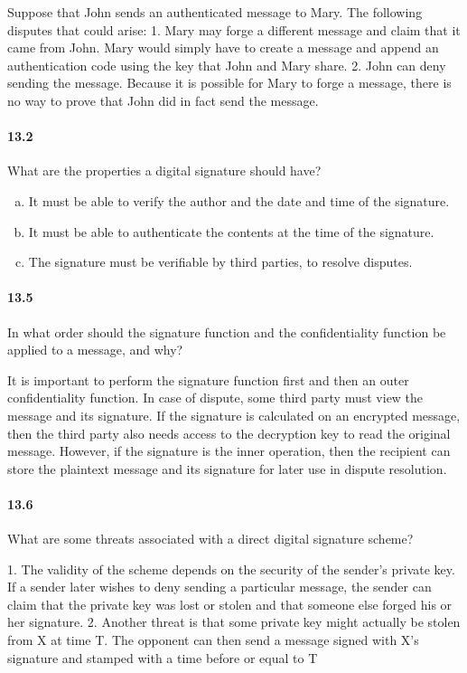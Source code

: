 \documentclass[UTF8]{article}
\begin{document}
Suppose that John sends an authenticated message to Mary. The following disputes that could arise: 1. Mary may forge a different message and claim that it came from John. Mary would simply have to create a message and append an authentication code using the key that John and Mary share. 2. John can deny sending the message. Because it is possible for Mary to forge a message, there is no way to prove that John did in fact send the message.
\paragraph{13.2}
What are the properties a digital signature should have?

\begin{enumerate}[(a)]
    \item It must be able to verify the author and the date and time of the signature. 
    \item It must be able to authenticate the contents at the time of the signature.
    \item The signature must be verifiable by third parties, to resolve disputes.
\end{enumerate}
\paragraph{13.5}
In what order should the signature function and the confidentiality function be applied to a message, and why?

It is important to perform the signature function first and then an outer confidentiality function. In case of dispute, some third party must view the message and its signature. If the signature is calculated on an encrypted message, then the third party also needs access to the decryption key to read the original message. However, if the signature is the inner operation, then the recipient can store the plaintext message and its signature for later use in dispute resolution.
\paragraph{13.6}
What are some threats associated with a direct digital signature scheme?

1. The validity of the scheme depends on the security of the sender's private key. If a sender later wishes to deny sending a particular message, the sender can claim that the private key was lost or stolen and that someone else forged his or her signature. 2. Another threat is that some private key might actually be stolen from X at time T. The opponent can then send a message signed with X's signature and stamped with a time before or equal to T
\end{document}
